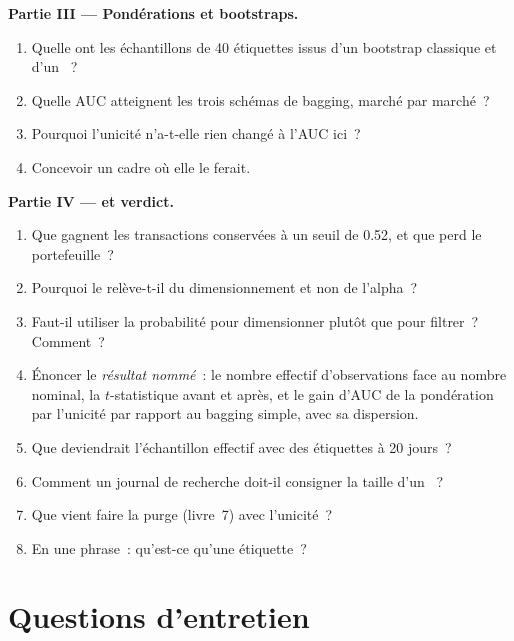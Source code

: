 \begin{problem}
\medskip\noindent\textbf{Partie III --- Pondérations et bootstraps.}
\begin{enumerate}[resume]
\item Quelle  ont les échantillons de 40 étiquettes issus d'un bootstrap classique et d'un ~?
\item Quelle AUC atteignent les trois schémas de bagging, marché par marché~?
\item Pourquoi l'unicité n'a-t-elle rien changé à l'AUC ici~?
\item Concevoir un cadre où elle le ferait.
\end{enumerate}

\medskip\noindent\textbf{Partie IV ---  et verdict.}
\begin{enumerate}[resume]
\item Que gagnent les transactions conservées à un seuil de 0.52, et que perd le portefeuille~?
\item Pourquoi le  relève-t-il du dimensionnement et non de l'alpha~?
\item Faut-il utiliser la probabilité pour dimensionner plutôt que pour filtrer~? Comment~?
\item Énoncer le \emph{résultat nommé}~: le nombre effectif d'observations face au nombre nominal, la $t$-statistique
avant et après, et le gain d'AUC de la pondération par l'unicité par rapport au bagging simple, avec sa dispersion.
\item Que deviendrait l'échantillon effectif avec des étiquettes à 20 jours~?
\item Comment un journal de recherche doit-il consigner la taille d'un ~?
\item Que vient faire la purge (livre~7) avec l'unicité~?
\item En une phrase~: qu'est-ce qu'une étiquette~?
\end{enumerate}
\end{problem}

\section{Questions d'entretien}

